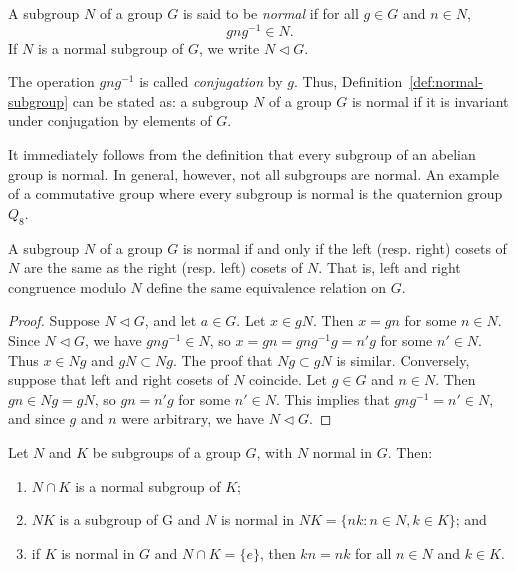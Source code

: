\begin{definition}
    \label{def:normal-subgroup}
    A subgroup \(N\) of a group \(G\) is said to be \emph{normal} if for all \(g
    \in G\) and \(n \in N\),
    \[
        gng^{-1} \in N.
    \]
    If \(N\) is a normal subgroup of \(G\), we write \(N \triangleleft G\).
\end{definition}

\begin{remark}
    The operation \(gng^{-1}\) is called \emph{conjugation} by \(g\). Thus,
    Definition~\ref{def:normal-subgroup} can be stated as: a subgroup \(N\) of a
    group \(G\) is normal if it is invariant under conjugation by elements of
    \(G\).
\end{remark}

\begin{example}
    It immediately follows from the definition that every subgroup of an abelian
    group is normal. In general, however, not all subgroups are normal. An
    example of a commutative group where every subgroup is normal is the
    quaternion group \(Q_8\).
\end{example}

\begin{theorem}
    A subgroup \(N\) of a group \(G\) is normal if and only if the left (resp.
    right) cosets of \(N\) are the same as the right (resp. left) cosets of
    \(N\). That is, left and right congruence modulo \(N\) define the same
    equivalence relation on \(G\).
\end{theorem}

\begin{proof}
    Suppose \(N \triangleleft G\), and let \(a \in G\). Let \(x \in gN\). Then
    \(x = gn\) for some \(n \in N\). Since \(N \triangleleft G\), we have
    \(gng^{-1} \in N\), so \(x = gn = gng^{-1}g = n'g\) for some \(n' \in N\).
    Thus \(x \in Ng\) and \(gN \subset Ng\). The proof that \(Ng \subset gN\) is
    similar. Conversely, suppose that left and right cosets of \(N\) coincide.
    Let \(g \in G\) and \(n \in N\). Then \(gn \in Ng = gN\), so \(gn = n'g\)
    for some \(n' \in N\). This implies that \(gng^{-1} = n' \in N\), and since
    \(g\) and \(n\) were arbitrary, we have \(N \triangleleft G\).
\end{proof}

\begin{theorem}
    \label{thm:normal-subgroup-props}
    Let \(N\) and \(K\) be subgroups of a group \(G\), with \(N\) normal in
    \(G\). Then:
    \begin{enumerate}[label=(\alph*)]
        \item \(N \cap K\) is a normal subgroup of \(K\);
        \item \(NK\) is a subgroup of G and \(N\) is normal in \(NK = \{nk : n
        \in N, k \in K\}\); and
        \item if \(K\) is normal in \(G\) and \(N \cap K = \{e\}\), then \(kn =
        nk\) for all \(n \in N\) and \(k \in K\).
    \end{enumerate}
\end{theorem}

